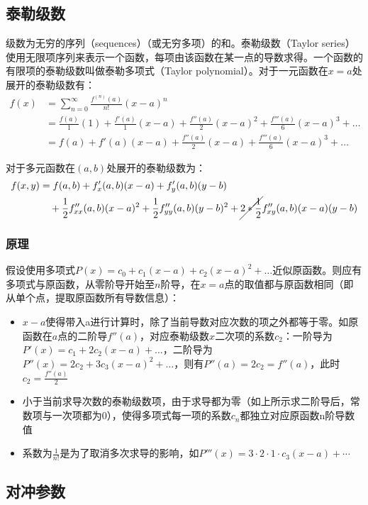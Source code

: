 \documentclass[11pt]{article}
\begin{document}
\subsection{泰勒级数}

级数为无穷的序列（sequences）（或无穷多项）的和。泰勒级数（Taylor series）使用无限项序列来表示一个函数，每项由该函数在某一点的导数求得。一个函数的有限项的泰勒级数叫做泰勒多项式（Taylor polynomial）。对于一元函数在$x=a$处展开的泰勒级数有：
\begin{align*}
    f(x) &= \sum^{\infty}_{n=0} \frac{f^{(n)}(a)}{n!}(x-a)^n \\
    &= \frac{f(a)}{1}(1)+ \frac{f'(a)}{1}(x-a) + \frac{f''(a)}{2}(x-a)^2 + \frac{f'''(a)}{6}(x-a)^3 + \dots \\
    &= f(a) + f'(a)(x-a) + \frac{f''(a)}{2}(x-a) + \frac{f'''(a)}{6}(x-a)^3 + \dots
\end{align*}

对于多元函数在$(a,b)$处展开的泰勒级数为：
\begin{align*}
    f(x,y) &= f(a,b) + f'_x(a,b)(x-a) + f'_y(a,b)(y-b) \\
    &\quad + \frac{1}{2}f''_{xx}(a,b)(x-a)^2 + \frac{1}{2}f''_{yy}(a,b)(y-b)^2 +\cancel{2*\frac{1}{2}}f''_{xy}(a,b)(x-a)(y-b)
\end{align*}

\subsubsection*{原理}
假设使用多项式$P(x) = c_0 + c_1 (x-a) + c_2 (x-a)^2 + \dots$近似原函数。则应有多项式与原函数，从零阶导开始至$n$阶导，在$x=a$点的取值都与原函数相同（即从单个点，提取原函数所有导数信息）：
\begin{itemize}
    \item $x-a$使得带入a进行计算时，除了当前导数对应次数的项之外都等于零。如原函数在$a$点的二阶导$f''(a)$，对应泰勒级数$x$二次项的系数$c_2$：一阶导为$P'(x) = c_1 + 2c_2(x-a)+\dots$，二阶导为$P''(x) = 2c_2 + 3c_3(x-a)^2 + \dots$，则有$P''(a) = 2c_2 = f''(a)$，此时$c_2 = \tfrac{f''(a)}{2}$
    \item 小于当前求导次数的泰勒级数项，由于求导都为零（如上所示求二阶导后，常数项与一次项都为0），使得多项式每一项的系数$c_n$都独立对应原函数n阶导数值
    \item 系数为$\frac{1}{n!}$是为了取消多次求导的影响，如$P'''(x)=3 \cdot 2 \cdot 1 \cdot c_3(x-a) + \cdots$
\end{itemize}

\subsection{对冲参数}
\end{document}
